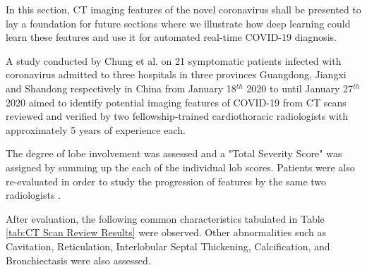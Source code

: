 In this section, CT imaging features of the novel coronavirus 
shall be presented to lay a foundation for future sections 
where we illustrate how deep learning could learn these features 
and use it for automated real-time COVID-19 diagnosis.

A study conducted by Chung et al. on 21 symptomatic  
patients infected with coronavirus admitted to three hospitals in 
three provinces Guangdong, Jiangxi 
and Shandong respectively in China from January 18$^{th}$ 2020 to 
until January 27$^{th}$ 2020 aimed to identify potential imaging 
features of COVID-19 from CT scans reviewed and verified by two fellowship-trained 
cardiothoracic radiologists with approximately 5 years of experience each.


The degree of lobe involvement was 
assessed and a "Total Severity Score" was assigned by summing up the each of the 
individual lob scores. Patients were also re-evaluated in order to study the 
progression of features by the same two radiologists \cite{CMA+2020}.

After evaluation, the following common characteristics tabulated in Table \ref{tab:CT Scan Review Results} were observed. Other abnormalities such as Cavitation, Reticulation, Interlobular Septal Thickening, Calcification, and Bronchiectasis were also assessed.
\vspace{1em}

